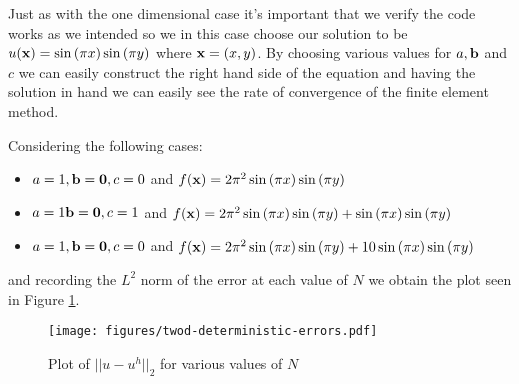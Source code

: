 Just as with the one dimensional case it's important that we verify the code
works as we intended so we in this case choose our solution to be
$u(\mathbf{x}) = \sin{(\pi x)}\sin{(\pi y)}$ where $\mathbf{x} = (x, y)$. By choosing
various values for $a, \mathbf{b}$ and $c$ we can easily construct the right hand
side of the equation and having the solution in hand we can easily see the rate
of convergence of the finite element method.

Considering the following cases:
\begin{itemize}
    \item $a = 1, \mathbf{b} = \mathbf{0}, c = 0$ and
          $f(\mathbf{x}) = 2\pi^2\sin{(\pi x)}\sin{(\pi y})$
    \item $a = 1 \mathbf{b} = \mathbf{0}, c = 1$ and
          $f(\mathbf{x}) = 2\pi^2\sin{(\pi x)}\sin{(\pi y)} +
                \sin{(\pi x)}\sin{(\pi y)}$
    \item $a = 1, \mathbf{b} = \mathbf{0}, c = 0$ and
          $f(\mathbf{x}) = 2\pi^2\sin{(\pi x)}\sin{(\pi y)} +
                10\sin{(\pi x)}\sin{(\pi y)}$
\end{itemize}

and recording the $L^2$ norm of the error at each value of $N$ we obtain the
plot seen in Figure \ref{fig:twod-deterministic-error}.

\begin{figure}
    \centering
    \texttt{[image: figures/twod-deterministic-errors.pdf]}
    \caption{Plot of $|| u - u^h ||_2$ for various values of  $N$}
    \label{fig:twod-deterministic-error}
\end{figure}

